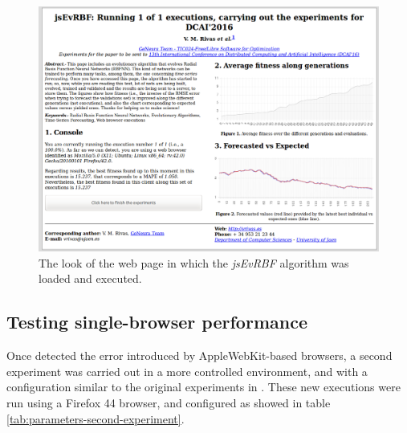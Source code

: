 \documentclass{article}
\begin{document}
\begin{figure}[!ht]
\includegraphics[width=120mm]{example-of-execution.png}
\caption{The look of the web page in which the {\em jsEvRBF} algorithm was loaded and executed.}
\label{fig:example-of-execution}
\end{figure}

\subsection{Testing single-browser performance}
\label{sec:second-experiment}

Once detected the error introduced by AppleWebKit-based browsers, a second experiment was carried out in a more controlled environment, and with a configuration similar to the original experiments in \cite{rivas03:EvRBF}. These new executions were run using a Firefox 44 browser, and configured as showed in table \ref{tab:parameters-second-experiment}.
\end{document}
